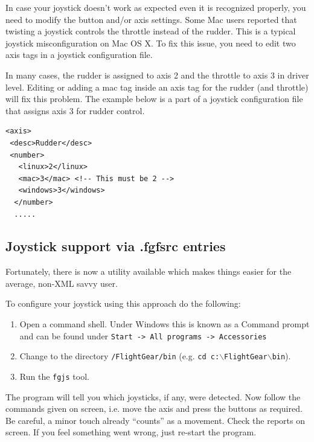 In case your joystick doesn't work as expected even it is recognized properly, you need to modify the button and/or axis settings. Some Mac users reported that twisting a joystick controls the throttle instead of the rudder. This is a typical joystick misconfiguration on Mac OS X. To fix this issue, you need to edit two axis tags in a joystick configuration file. 

In many cases, the rudder is assigned to axis 2 and the throttle to axis 3 in driver level. Editing or adding a mac tag inside an axis tag for the rudder (and throttle) will fix this problem. The example below is a part of a joystick configuration file that assigns axis 3 for rudder control. 

\begin{verbatim}
<axis>
 <desc>Rudder</desc>
 <number>
   <linux>2</linux>
   <mac>3</mac> <!-- This must be 2 -->
   <windows>3</windows>
  </number>
  .....
\end{verbatim}

\subsection{Joystick support via .fgfsrc entries\label{fgfsrcjoy}}
Fortunately, there is now a utility available which makes things easier for the average, non-XML savvy user.

To configure your joystick using this approach do the following:

\begin{enumerate}
\item Open a command shell. Under Windows this is known as a Command prompt and can be found under \texttt{Start -> All programs -> Accessories}
\item Change to the directory \texttt{/FlightGear/bin} (e.g. \texttt{cd c:$\backslash$FlightGear$\backslash$bin}).
\item Run the \texttt{fgjs} tool.
\end{enumerate}

The program will tell you which joysticks, if any, were detected. Now follow the
commands given on screen, i.e. move the axis and press the buttons as required.
Be careful, a minor touch already ``counts'' as a movement. Check the reports
on screen. If you feel something went wrong, just re-start the program.

